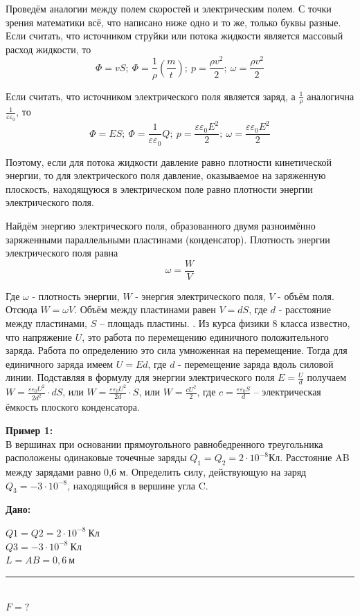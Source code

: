 \documentclass[a5paper, 10pt]{diss_4}
\renewcommand{\'}{\,'}
\begin{document}
  Проведём аналогии между полем скоростей и электрическим полем. С точки
зрения математики всё, что написано ниже одно и то же, только буквы разные.
Если считать, что источником струйки или потока жидкости является массовый
расход жидкости, то
\[
\Phi=vS;\
\Phi=\frac{1}{\rho}(\frac{m}{t});\
p=\frac{\rho v^2}{2};\
\omega=\frac{\rho v^2}{2}
\]

 Если считать, что источником электрического поля является заряд, а
$\frac{1}{\rho}$ аналогична $\frac{1}{\varepsilon\varepsilon_0}$, то
\[
\Phi=ES;\
\Phi=\frac{1}{\varepsilon\varepsilon_0}Q;\
p=\frac{\varepsilon\varepsilon_0 E^2}{2};\
\omega=\frac{\varepsilon\varepsilon_0 E^2}{2}
\]

 Поэтому, если для потока жидкости давление равно плотности кинетической
энергии, то для электрического поля давление, оказываемое на заряженную
плоскость, находящуюся в электрическом поле равно плотности энергии
электрического поля.

 Найдём энергию электрического поля, образованного двумя разноимённо заряженными
параллельными пластинами (конденсатор). Плотность энергии электрического поля
равна
\[
\omega=\frac{W}{V}
\]

  Где $\omega$ - плотность энергии, $W$ - энергия электрического поля, $V$ -
объём поля. Отсюда $W=\omega V$. Объём между пластинами равен $V=dS$, где $d$ -
 расстояние между пластинами, $S$ -- площадь пластины. . Из курса физики 8
класса известно, что напряжение $U$, это работа по перемещению единичного
положительного заряда. Работа по определению это сила умноженная на
перемещение. Тогда для единичного заряда имеем $U=Ed$, где $d$ - перемещение
заряда вдоль силовой линии. Подставляя в формулу для энергии электрического
поля $E=\frac{U}{d}$ получаем $W=\frac{\varepsilon\varepsilon_0U^2}{2d^2}\cdot
 dS$, или $W=\frac{\varepsilon\varepsilon_0U^2}{2d}\cdot S$, или
$W=\frac{cU^2}{2}$, где $c=\frac{\varepsilon\varepsilon_0S}{d}$ --
электрическая ёмкость плоского конденсатора.

\textbf{Пример 1:}\\

  В вершинах при основании прямоугольного равнобедренного треугольника
расположены одинаковые точечные заряды $Q_1 = Q_2 = 2\cdot10^{-8} Кл$.
Расстояние AB между зарядами равно 0,6 м. Определить силу, действующую на
заряд $Q_3=-3\cdot10^{-8}$, находящийся в вершине угла C.

\hspace{1cm}\textbf{Дано:}\hspace{.3cm}
\parbox[t]{4cm}{
$Q1 = Q2 = 2\cdot10^{-8}\ Кл$\\
$Q3 = -3\cdot10^{-8}\ Кл$\\
$L = AB = 0,6\ м$\\
\rule{4cm}{.4pt}\\
$F = ?$\\
}
\end{document}
